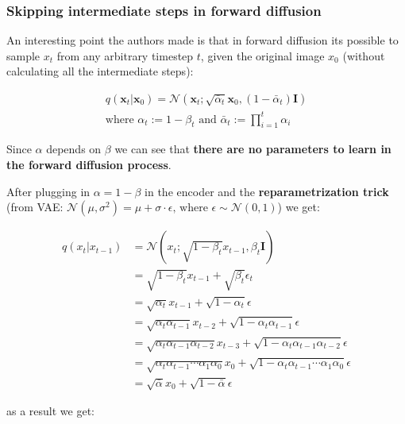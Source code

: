 \subsubsection*{Skipping intermediate steps in forward diffusion}


An interesting point the authors made is that in forward diffusion its possible to sample $x_t$ from any arbitrary timestep $t$, given the original image $x_0$ (without calculating all the intermediate steps):

\begin{equation}
    \begin{aligned}
    q(\mathbf{x}_t|\mathbf{x}_0) = \mathcal{N}(\mathbf{x}_t; \sqrt{\bar{\alpha}_t}\mathbf{x}_0, (1 - \bar{\alpha}_t)\mathbf{I}) \\
    \text{where } \alpha_t := 1 - \beta_t \text{ and } \bar{\alpha}_t := \prod_{i=1}^{t} \alpha_i
    \end{aligned}
    \label{eq:forward_diffusion}
\end{equation}

Since $\alpha$ depends on $\beta$ we can see that \textbf{there are no parameters to learn in the forward diffusion process}.

After plugging in $\alpha = 1 - \beta$ in the encoder and the \textbf{reparametrization trick} (from VAE: $\mathcal{N} (\mu, \sigma^2) = \mu + \sigma \cdot \epsilon \text{, where } \epsilon \sim \mathcal{N}(0, 1) $) we get:

\begin{align*}
    q(x_t | x_{t-1}) &= \mathcal{N} \left( x_t; \sqrt{1-\beta_t} x_{t-1}, \beta_t \mathbf{I} \right) \\
    &= \sqrt{1-\beta_t} x_{t-1} + \sqrt{\beta_t} \epsilon_t \\
    &= \sqrt{\alpha_t} x_{t-1} + \sqrt{1 - \alpha_t} \epsilon \\
    &= \sqrt{\alpha_t \alpha_{t-1}} x_{t-2} + \sqrt{1 - \alpha_t \alpha_{t-1}} \epsilon \\
    &= \sqrt{\alpha_t \alpha_{t-1} \alpha_{t-2}} x_{t-3} + \sqrt{1 - \alpha_t \alpha_{t-1} \alpha_{t-2}} \epsilon \\
    &= \sqrt{\alpha_t \alpha_{t-1} \cdots \alpha_1 \alpha_0} x_0 + \sqrt{1 - \alpha_t \alpha_{t-1} \cdots \alpha_1 \alpha_0} \epsilon \\
    &= \boxed{ \sqrt{\bar{\alpha}} x_0 + \sqrt{1 - \bar{\alpha}} \epsilon }
\end{align*}

as a result we get:

